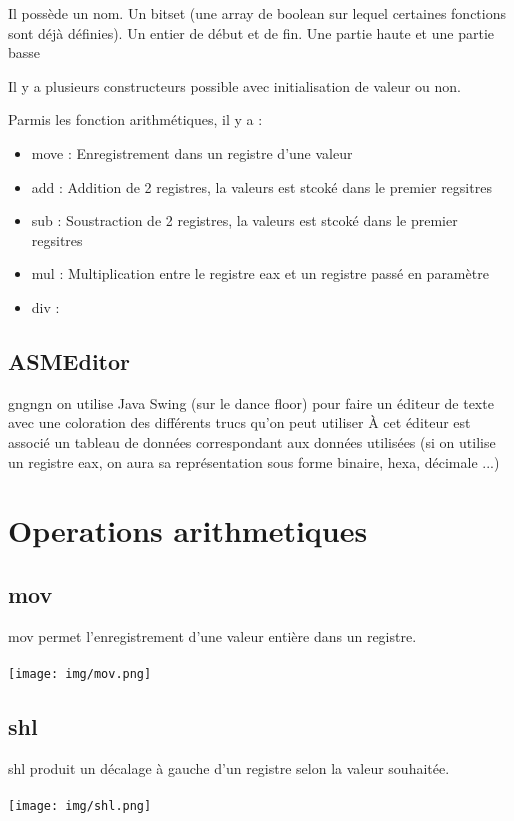 \documentclass{article}
\begin{document}
Il possède un nom.
Un bitset (une array de boolean sur lequel certaines fonctions sont déjà définies).
Un entier de début et de fin.
Une partie haute et une partie basse

Il y a plusieurs constructeurs possible avec initialisation de valeur ou non.

Parmis les fonction arithmétiques, il y a :
\begin{itemize}
    \item move : Enregistrement dans un registre d'une valeur
    \item add : Addition de 2 registres, la valeurs est stcoké dans le premier regsitres
    \item sub : Soustraction de 2 registres, la valeurs est stcoké dans le premier regsitres
    \item mul : Multiplication entre le registre eax et un registre passé en paramètre
    \item div :
\end{itemize}


\subsection{ASMEditor}
gngngn on utilise Java Swing (sur le dance floor) pour faire un éditeur de texte avec une coloration des différents trucs qu'on peut utiliser
À cet éditeur est associé un tableau de données correspondant aux données utilisées (si on utilise un registre eax, on aura sa représentation sous forme binaire, hexa, décimale ...)

\section{Operations arithmetiques}
\subsection{mov}
mov permet l'enregistrement d'une valeur entière dans un registre.
\\
\\
\texttt{[image: img/mov.png]}

\subsection{shl}
shl produit un décalage à gauche d'un registre selon la valeur souhaitée.
\\
\\
\texttt{[image: img/shl.png]}
\end{document}
